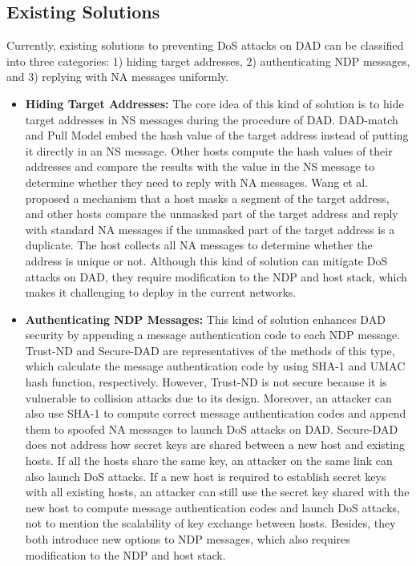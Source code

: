\documentclass[a4paper,fleqn]{cas-dc}
\begin{document}
    \subsection{Existing Solutions}
        Currently, existing solutions to preventing DoS attacks on DAD can be classified into three categories: 1) hiding target addresses, 2) authenticating NDP messages, and 3) replying with NA messages uniformly.

        \begin{itemize}
        \item\textbf{Hiding Target Addresses:}
            The core idea of this kind of solution is to hide target addresses in NS messages during the procedure of DAD. DAD-match \cite{DAD-match} and Pull Model \cite{pull-model} embed the hash value of the target address instead of putting it directly in an NS message. Other hosts compute the hash values of their addresses and compare the results with the value in the NS message to determine whether they need to reply with NA messages. Wang et al. \cite{part-dad} proposed a mechanism that a host masks a segment of the target address, and other hosts compare the unmasked part of the target address and reply with standard NA messages if the unmasked part of the target address is a duplicate. The host collects all NA messages to determine whether the address is unique or not. Although this kind of solution can mitigate DoS attacks on DAD, they require modification to the NDP and host stack, which makes it challenging to deploy in the current networks.

        \item\textbf{Authenticating NDP Messages:}
            This kind of solution enhances DAD security by appending a message authentication code to each NDP message. Trust-ND \cite{trust-nd} and Secure-DAD \cite{secure-dad} are representatives of the methods of this type, which calculate the message authentication code by using SHA-1 and UMAC hash function, respectively. 
            However, Trust-ND is not secure because it is vulnerable to collision attacks due to its design. Moreover, an attacker can also use SHA-1 to compute correct message authentication codes and append them to spoofed NA messages to launch DoS attacks on DAD. Secure-DAD does not address how secret keys are shared between a new host and existing hosts. If all the hosts share the same key, an attacker on the same link can also launch DoS attacks. If a new host is required to establish secret keys with all existing hosts, an attacker can still use the secret key shared with the new host to compute message authentication codes and launch DoS attacks, not to mention the scalability of key exchange between hosts.
            Besides, they both introduce new options to NDP messages, which also requires modification to the NDP and host stack. 
        

\end{itemize}
\end{document}
